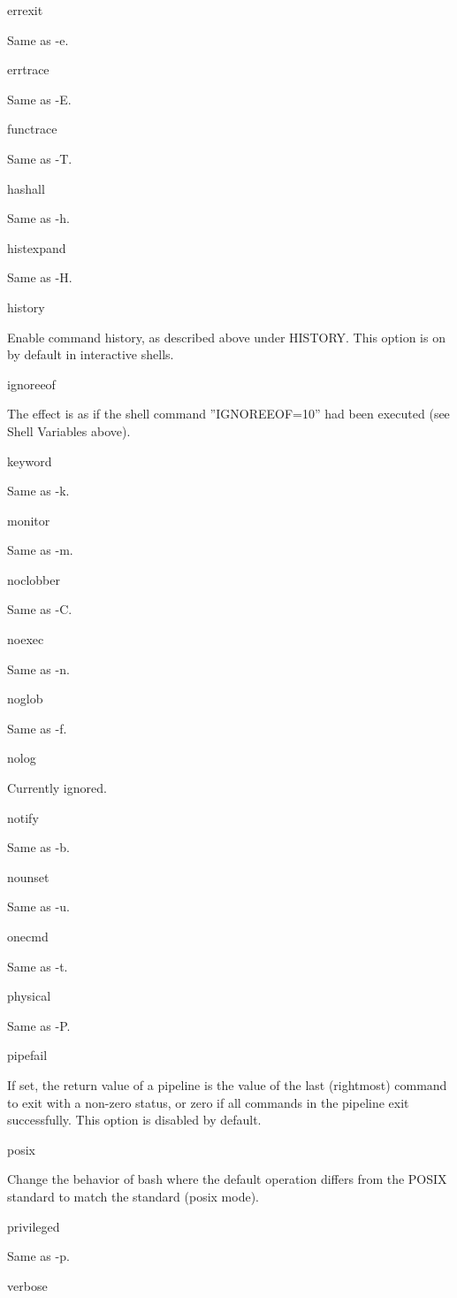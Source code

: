 errexit

Same as -e.

errtrace

Same as -E.

functrace

Same as -T.

hashall

Same as -h.

histexpand

Same as -H.

history

Enable command history, as described above under HISTORY. This option is on by default in interactive shells.

ignoreeof

The effect is as if the shell command ''IGNOREEOF=10'' had been executed (see Shell Variables above).

keyword

Same as -k.

monitor

Same as -m.

noclobber

Same as -C.

noexec

Same as -n.

noglob

Same as -f.

nolog

Currently ignored.

notify

Same as -b.

nounset

Same as -u.

onecmd

Same as -t.

physical

Same as -P.

pipefail

If set, the return value of a pipeline is the value of the last (rightmost) command to exit with a non-zero status, or zero if all commands in the pipeline exit successfully. This option is disabled by default.

posix

Change the behavior of bash where the default operation differs from the POSIX standard to match the standard (posix mode).

privileged

Same as -p.

verbose

